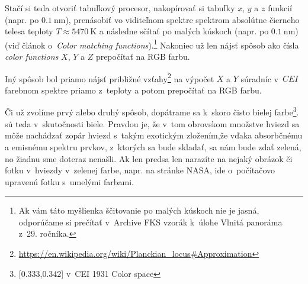 Stačí si teda otvoriť tabuľkový procesor, nakopírovať si tabuľky $x$, $y$ a $z$ funkcií (napr. po $\SI{0.1}{\nano\metre}$), prenásobiť vo viditeľnom spektre spektrom
absolútne čierneho telesa teploty $T \approx \SI{5470}{\kelvin}$ a následne sčítať po malých kúskoch (napr. po $\SI{0.1}{\nano\metre}$)
(viď článok o~\emph{Color matching functions}).\footnote{Ak vám táto myšlienka ščitovanie po malých kúskoch nie je jasná,
odporúčame si prečítať v~Archive FKS vzorák k~úlohe Vlnitá panoráma z~29. ročníka.} Nakoniec už len nájsť spôsob ako čísla \emph{color functions} $X$, $Y$ a $Z$ prepočítať na RGB farbu. 

Iný spôsob bol priamo nájsť približné vzťahy\footnote{\url{https://en.wikipedia.org/wiki/Planckian_locus#Approximation}} na výpočet $X$ a $Y$ súradníc v~$CEI$ farebnom spektre priamo z~teploty a potom prepočítať na RGB farbu.

Či už zvolíme prvý alebo druhý spôsob, dopátrame sa k~skoro čisto bielej farbe\footnote{[0.333,0.342] v~CEI 1931 Color space}.
 sú teda v~skutočnosti biele. Pravdou je, že v~tom obrovskom množstve hviezd sa môže nachádzať zopár hviezd s~takým exotickým zložením,že vďaka absorbčnému a emisnému spektru prvkov, z~ktorých sa bude skladať, sa nám bude zdať zelená, no žiadnu sme doteraz nenašli. Ak len predsa len narazíte na nejaký obrázok či fotku v~hviezdy v~zelenej farbe, napr. na stránke NASA, ide o~počítačovo upravenú fotku s~umelými farbami.
